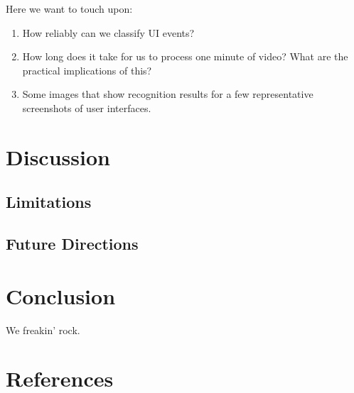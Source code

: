 \documentclass[12pt]{memoir}
\begin{document}
Here we want to touch upon:
\begin{enumerate}[noitemsep]
\item How reliably can we classify UI events?
\item How long does it take for us to process one minute of video?  What are
the practical implications of this?
\item Some images that show recognition results for a few representative
screenshots of user interfaces.
\end{enumerate}


\section{Discussion}

\subsection{Limitations}

\subsection{Future Directions}


\section{Conclusion}
 
We freakin' rock.


\section{References}
\printbibliography[heading=none]
\end{document}
